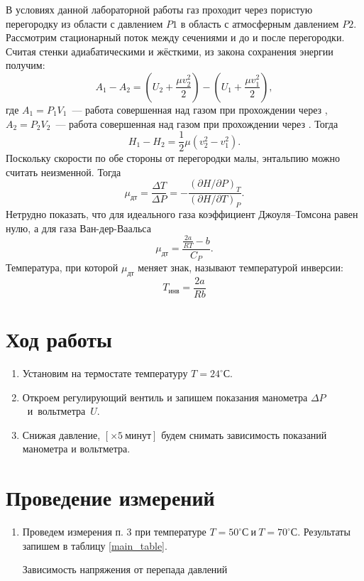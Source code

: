 \documentclass[a4paper,12pt]{article} %
\newcommand{\RomanNumeralCaps}[1]
{\MakeUppercase{\romannumeral #1}}
\begin{document}
\noindent В условиях данной лабораторной работы газ проходит через пористую
перегородку из области с давлением $ P1 $ в область с атмосферным давлением 
$ P2 $. Рассмотрим стационарный поток между сечениями \RomanNumeralCaps{1}
и \RomanNumeralCaps{2} до и после перегородки. Считая стенки
адиабатическими и жёсткими, из закона сохранения энергии получим: 
\begin{equation}\label{}
	A_1-A_2=
	\left(U_2+\dfrac{\mu v_2^2}{2}\right)-
	\left(U_1+\dfrac{\mu v_1^2}{2}\right),
\end{equation}
где $ A_1=P_1V_1 $~--- работа совершенная над газом при прохождении
через \RomanNumeralCaps{1}, $ A_2=P_2V_2 $~--- работа совершенная над
газом при прохождении через \RomanNumeralCaps{2}. Тогда
\begin{equation}\label{}
	H_1-H_2=\dfrac{1}{2}\mu(v_2^2-v_1^2).
\end{equation}
Поскольку скорости по обе стороны от перегородки малы, энтальпию можно
считать неизменной. Тогда 
\begin{equation}\label{}
	\mu_{дт}=\dfrac{\Delta T}{\Delta P}=
	-\dfrac{(\partial H/\partial P)_T}{(\partial H/\partial T)_P}.
\end{equation}
Нетрудно показать, что для идеального газа коэффициент Джоуля–Томсона равен
нулю, а для газа Ван-дер-Ваальса 
\begin{equation}\label{}
	\mu_{дт}=\dfrac{\frac{2a}{RT}-b}{C_P}.
\end{equation}
Температура, при которой $ \mu_{дт} $ меняет знак, называют температурой
инверсии: 
\begin{equation}\label{}
	T_{инв}=\dfrac{2a}{Rb}
\end{equation}


\section{Ход работы}
\begin{enumerate}
	\item Установим на термостате температуру $ T=24^\circ С $. 
	\item Откроем регулирующий вентиль и запишем показания 
	манометра $ \Delta P $~и~вольтметра~$ U $. 
	\item Снижая давление, $ [\times5~минут] $ будем снимать зависимость
	показаний манометра и вольтметра.
\end{enumerate}

\section{Проведение измерений}
\begin{enumerate}
	\item Проведем измерения п. 3 при температуре
	$ T=50^\circ С~и~T=70^\circ С $. Результаты запишем в таблицу \ref{main_table}.
	
	\begin{table}[!h]\centering\small
		
		\caption{Зависимость напряжения от перепада давлений}
		\label{main_table}
	\end{table}
\end{enumerate}
\end{document}
